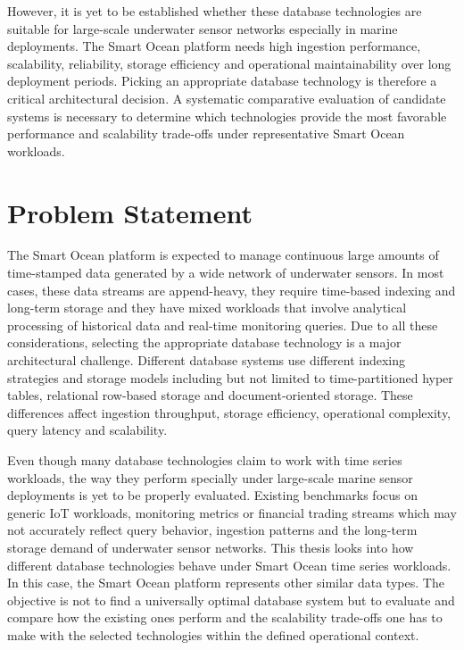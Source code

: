 However, it is yet to be established whether these database technologies are suitable for large-scale underwater sensor networks especially in marine deployments. The Smart Ocean platform needs high ingestion performance, scalability, reliability, storage efficiency and operational maintainability over long deployment periods. Picking an appropriate database technology is therefore a critical architectural decision. A systematic comparative evaluation of candidate systems is necessary to determine which technologies provide the most favorable performance and scalability trade-offs under representative Smart Ocean workloads.

\section{Problem Statement}
The Smart Ocean platform is expected to manage continuous large amounts of time-stamped data generated by a wide network of underwater sensors. In most cases, these data streams are append-heavy, they require time-based indexing and long-term storage and they have mixed workloads that involve analytical processing of historical data and real-time monitoring queries. Due to all these considerations, selecting the appropriate database technology is a major architectural challenge. Different database systems use different indexing strategies and storage models including but not limited to time-partitioned hyper tables, relational row-based storage and document-oriented storage. These differences affect ingestion throughput, storage efficiency, operational complexity, query latency and scalability. 

Even though many database technologies claim to work with time series workloads, the way they perform specially under large-scale marine sensor deployments is yet to be properly evaluated. Existing benchmarks focus on generic IoT workloads, monitoring metrics or financial trading streams which may not accurately reflect query behavior, ingestion patterns and the long-term storage demand of underwater sensor networks. This thesis looks into how different database technologies behave under Smart Ocean time series workloads. In this case, the Smart Ocean platform represents other similar data types. The objective is not to find a universally optimal database system but to evaluate and compare how the existing ones perform and the scalability trade-offs one has to make with the selected technologies within the defined operational context. 


